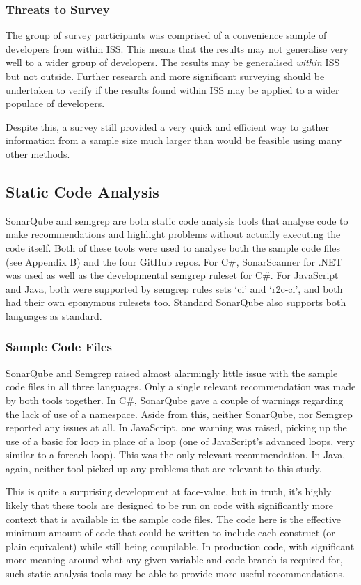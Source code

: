 \documentclass{article}
\begin{document}
        \subsubsection{Threats to Survey}
            The group of survey participants was comprised of a convenience sample of developers from within ISS. This means that the results may not generalise very well to a wider group of developers. The results may be generalised \emph{within} ISS but not outside. Further research and more significant surveying should be undertaken to verify if the results found within ISS may be applied to a wider populace of developers.

            Despite this, a survey still provided a very quick and efficient way to gather information from a sample size much larger than would be feasible using many other methods.
    \subsection{Static Code Analysis}
        SonarQube and semgrep are both static code analysis tools that analyse code to make recommendations and highlight problems without actually executing the code itself. Both of these tools were used to analyse both the sample code files (see Appendix B) and the four GitHub repos. For C\#, SonarScanner for .NET was used as well as the developmental semgrep ruleset for C\#. For JavaScript and Java, both were supported by semgrep rules sets `ci' and `r2c-ci', and both had their own eponymous rulesets too. Standard SonarQube also supports both languages as standard.
        \subsubsection{Sample Code Files}
            SonarQube and Semgrep raised almost alarmingly little issue with the sample code files in all three languages. Only a single relevant recommendation was made by both tools together.
            In C\#, SonarQube gave a couple of warnings regarding the lack of use of a namespace. Aside from this, neither SonarQube, nor Semgrep reported any issues at all. In JavaScript, one warning was raised, picking up the use of a basic for loop in place of a  loop (one of JavaScript's advanced loops, very similar to a foreach loop). This was the only relevant recommendation. In Java, again, neither tool picked up any problems that are relevant to this study.

            This is quite a surprising development at face-value, but in truth, it's highly likely that these tools are designed to be run on code with significantly more context that is available in the sample code files. The code here is the effective minimum amount of code that could be written to include each construct (or plain equivalent) while still being compilable. In production code, with significant more meaning around what any given variable and code branch is required for, such static analysis tools may be able to provide more useful recommendations.
\end{document}
